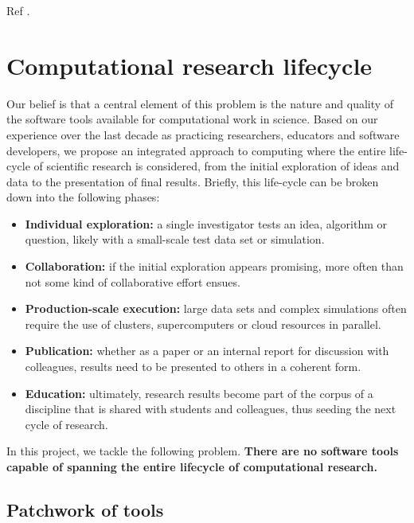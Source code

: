 \documentclass[ChapterTOCs,krantz2]{krantz} %
\begin{document}
Ref \cite{10.3389/fncom.2012.00018}.

\section{\label{sec:lifecycle}Computational research lifecycle}


Our belief is that a central element
of this problem is the nature and quality of the software tools available
for computational work in science. Based on our experience over the
last decade as practicing researchers, educators and software developers,
we propose an integrated approach to computing where the entire life-cycle
of scientific research is considered, from the initial exploration
of ideas and data to the presentation of final results. Briefly, this
life-cycle can be broken down into the following phases:
\begin{itemize}
\item \textbf{Individual exploration:} a single investigator tests an idea,
algorithm or question, likely with a small-scale test data set or
simulation.
\item \textbf{Collaboration:} if the initial exploration appears promising,
more often than not some kind of collaborative effort ensues.
\item \textbf{Production-scale execution:} large data sets and complex simulations
often require the use of clusters, supercomputers or cloud resources
in parallel.
\item \textbf{Publication:} whether as a paper or an internal report for
discussion with colleagues, results need to be presented to others
in a coherent form.
\item \textbf{Education:} ultimately, research results become part of the
corpus of a discipline that is shared with students and colleagues,
thus seeding the next cycle of research.
\end{itemize}
In this project, we tackle the following problem.\textbf{ There are
no software tools capable of spanning the entire lifecycle of computational
research.}

\subsection{Patchwork of tools}
\end{document}
